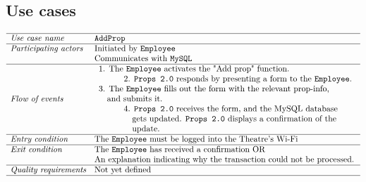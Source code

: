 \documentclass[12pt]{article}
\begin{document}
\subsection{Use cases}
\[
\begin{array}{ll}
\hline
\textit{Use case name} & \texttt{AddProp} \\
\hline
\textit{Participating actors} & \text{Initiated by \texttt{Employee}} \\
& \text{Communicates with \texttt{MySQL}} \\
\hline
\textit{Flow of events} & 
\begin{array}{l}
\text{1. The \texttt{Employee} activates the "Add prop"  function.}\\
\quad \quad \quad \text{2. \texttt{Props 2.0} responds by presenting a form to the \texttt{Employee}.} \\
\text{3. The \texttt{Employee} fills out the form with the relevant prop-info,} \\ \quad \text{and submits it.} \\
\quad \quad \quad \text{4. \texttt{Props 2.0} receives the form, and the MySQL database} \\ \quad \quad \quad \quad \text{gets updated. \texttt{Props 2.0} displays a confirmation of the}\\ \quad \quad \quad \quad \text{update.}
\end{array} \\
\hline
\textit{Entry condition} & \text{The \texttt{Employee} must be logged into the Theatre's Wi-Fi} \\
\hline
\textit{Exit condition} & \text{The \texttt{Employee} has received a confirmation OR} \\ & \text{An explanation indicating why the transaction could not be processed.} \\
\hline
\textit{Quality requirements} & \text{Not yet defined} \\
\hline
\end{array}
\]
\end{document}
